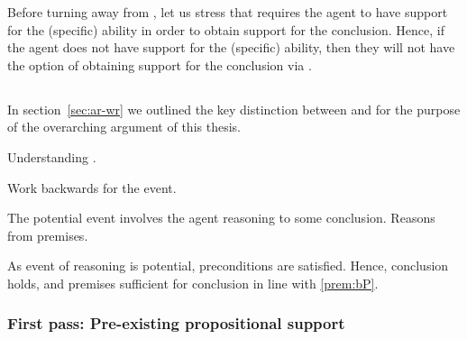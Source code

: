 \begin{note}
  Before turning away from \AR{}, let us stress that \AR{} requires the agent to have support for the (specific) ability in order to obtain support for the conclusion.
  Hence, if the agent does not have support for the (specific) ability, then they will not have the option of obtaining support for the conclusion via \AR{}.
\end{note}

\subsection{\WR{}}
\label{sec:wr}

\begin{note}[Overview]
  In section~\ref{sec:ar-wr} we outlined the key distinction between \AR{} and \WR{} for the purpose of the overarching argument of this thesis.

  Understanding \WR{}.
\end{note}

\begin{note}
  Work backwards for the event.

  The potential event involves the agent reasoning to some conclusion.
  Reasons from premises.

  As event of reasoning is potential, preconditions are satisfied.
  Hence, conclusion holds, and premises sufficient for conclusion in line with \ref{prem:bP}.
\end{note}

\subsubsection{First pass: Pre-existing propositional support}
\label{sec:first-pass:-prop}

